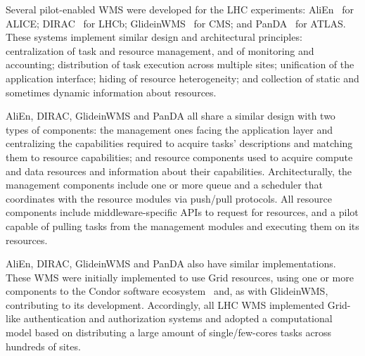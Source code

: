 




Several pilot-enabled WMS were developed for the LHC experiments:
AliEn~\cite{Bagnasco2010} for ALICE; DIRAC~\cite{Paterson2010} for LHCb;
GlideinWMS~\cite{sfiligoi2008glideinwms} for CMS; and
PanDA~\cite{maeno2014evolution} for ATLAS. These systems implement similar
design and architectural principles: centralization of task and resource
management, and of monitoring and accounting; distribution of task execution
across multiple sites; unification of the application interface; hiding of
resource heterogeneity; and collection of static and sometimes dynamic
information about resources.

AliEn, DIRAC, GlideinWMS and PanDA all share a similar design with two types of
components: the management ones facing the application layer and centralizing
the capabilities required to acquire tasks' descriptions and matching them to
resource capabilities; and resource components used to acquire compute and data
resources and information about their capabilities. Architecturally, the
management components include one or more queue and a scheduler that coordinates
with the resource modules via push/pull protocols. All resource components
include middleware-specific APIs to request for resources, and a pilot capable
of pulling tasks from the management modules and executing them on its
resources.

AliEn, DIRAC, GlideinWMS and PanDA also have similar implementations. These WMS
were initially implemented to use Grid resources, using one or more components
to the Condor software ecosystem~\cite{thain2005distributed} and, as with
GlideinWMS, contributing to its development. Accordingly, all LHC WMS
implemented Grid-like authentication and authorization systems and adopted a
computational model based on distributing a large amount of single/few-cores
tasks across hundreds of sites.

